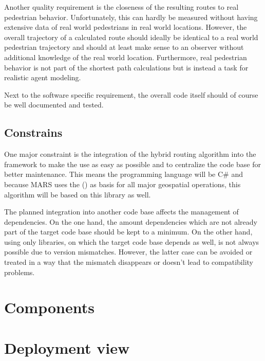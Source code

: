 		Another quality requirement is the closeness of the resulting routes to real pedestrian behavior.
		Unfortunately, this can hardly be measured without having extensive data of real world pedestrians in real world locations.
		However, the overall trajectory of a calculated route should ideally be identical to a real world pedestrian trajectory and should at least make sense to an observer without additional knowledge of the real world location.
		Furthermore, real pedestrian behavior is not part of the shortest path calculations but is instead a task for realistic agent modeling.

		Next to the software specific requirement, the overall code itself should of course be well documented and tested.
	
	\subsection{Constrains}
	\label{subsec:constrains}
		
		One major constraint is the integration of the hybrid routing algorithm into the  framework to make the use as easy as possible and to centralize the code base for better maintenance.
		This means the programming language will be C\# and because MARS uses the  () as basis for all major geospatial operations, this algorithm will be based on this library as well.
		
		The planned integration into another code base affects the management of dependencies.
		On the one hand, the amount dependencies which are not already part of the target code base should be kept to a minimum.
		On the other hand, using only libraries, on which the target code base depends as well, is not always possible due to version mismatches.
		However, the latter case can be avoided or treated in a way that the mismatch disappears or doesn't lead to compatibility problems.
	
	
\section{Components}
\label{sec:components}


\section{Deployment view}


